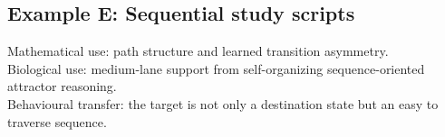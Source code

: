 \subsection*{Example E: Sequential study scripts}

Mathematical use: path structure and learned transition asymmetry.\\
Biological use: medium-lane support from self-organizing sequence-oriented
attractor reasoning.\\
Behavioural transfer: the target is not only a destination state but an easy
to traverse sequence.
